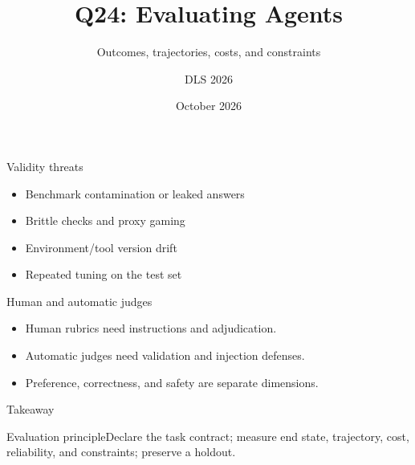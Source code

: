 \documentclass[aspectratio=169,10pt]{beamer}\usetheme{metropolis}\title{Q24: Evaluating Agents}\subtitle{Outcomes, trajectories, costs, and constraints}\author{DLS 2026}\date{October 2026}
\begin{document}
\begin{frame}{Validity threats}\begin{itemize}\item Benchmark contamination or leaked answers\item Brittle checks and proxy gaming\item Environment/tool version drift\item Repeated tuning on the test set\end{itemize}\end{frame}
\begin{frame}{Human and automatic judges}\begin{itemize}\item Human rubrics need instructions and adjudication.\item Automatic judges need validation and injection defenses.\item Preference, correctness, and safety are separate dimensions.\end{itemize}\end{frame}
\begin{frame}{Takeaway}\begin{block}{Evaluation principle}Declare the task contract; measure end state, trajectory, cost, reliability, and constraints; preserve a holdout.\end{block}\end{frame}
\end{document}
